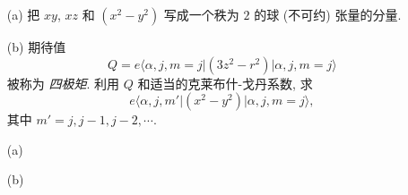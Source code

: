\documentclass{assignment}
\begin{document}
\begin{prob}[课本习题 3.32]
    \begin{itemize}
        \item[(a)] 把 $xy$, $xz$ 和 $(x^2-y^2)$ 写成一个秩为 $2$ 的球 (不可约) 张量的分量.
        \item[(b)] 期待值
        \[
            Q=e\langle\alpha,j,m=j\rvert(3z^2-r^2)\lvert\alpha,j,m=j\rangle
        \]
        被称为 \textit{四极矩}. 利用 $Q$ 和适当的克莱布什-戈丹系数, 求
        \[
            e\langle\alpha,j,m'\rvert(x^2-y^2)\lvert\alpha,j,m=j\rangle,
        \]
        其中 $m'=j,j-1,j-2,\cdots$.
    \end{itemize}
\end{prob}
\begin{sol}
    \begin{itemize}
        \item[(a)] 
        \item[(b)] 
    \end{itemize}
\end{sol}
\end{document}
